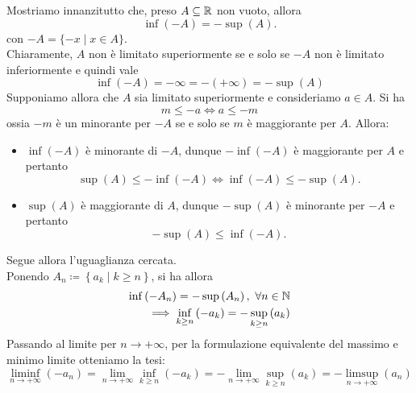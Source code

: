 \begin{solution}
Mostriamo innanzitutto che, preso $A\subseteq\mathbb{R}$ non vuoto, allora
\begin{equation*}
	\inf\left(-A\right)=-\sup\left(A\right).
\end{equation*}
con $-A=\{ -x\mid x\in A \}$.\\
Chiaramente, $A$ non è limitato superiormente se e solo se $-A$ non è limitato inferiormente e quindi vale
\begin{equation*}
	\inf\left(-A\right)=-\infty=-\left(+\infty\right)=-\sup\left(A\right)
\end{equation*}
Supponiamo allora che $A$ sia limitato superiormente e consideriamo $a\in A$. Si ha
\begin{equation*}
	m\leq -a\iff a\leq -m
\end{equation*}
ossia $-m$ è un minorante per $-A$ se e solo se $m$ è maggiorante per $A$. Allora:
\begin{itemize}
	\item $\inf\left(-A\right)$ è minorante di $-A$, dunque $-\inf\left(-A\right)$ è maggiorante per $A$ e pertanto
	\begin{equation*}
		\sup\left(A\right)\leq-\inf\left(-A\right)\iff\inf\left(-A\right)\leq-\sup\left(A\right).
	\end{equation*}
	\item $\sup\left(A\right)$ è maggiorante di $A$, dunque $-\sup\left(A\right)$ è minorante per $-A$ e pertanto
	\begin{equation*}
		-\sup\left(A\right)\leq\inf\left(-A\right).
	\end{equation*}
\end{itemize}
Segue allora l'uguaglianza cercata.\\
Ponendo	$A_n\coloneqq\left\{a_k\mid k\geq n\right\}$, si ha allora
\begin{align*}
	\inf\left(-A_n\right)=-\sup\left(A_n\right),\ \forall n\in\mathbb{N}\\
	\implies\inf_{k\geq n}\left(-a_k\right)=-\sup_{k\geq n}\left(a_k\right)
\end{align*}
Passando al limite per $n\to+\infty$, per la formulazione equivalente del massimo e minimo limite otteniamo la tesi:
\begin{equation*}
	\liminf_{n\to +\infty}\left(-a_n\right)=\lim_{n\to+\infty}\inf_{k\geq n}\left(-a_k\right)=-\lim_{n\to+\infty}\sup_{k\geq n}\left(a_k\right)=-\limsup_{n\to+\infty}\left(a_n\right)
\end{equation*}
\end{solution}
